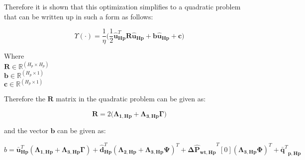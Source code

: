 Therefore it is shown that this optimization simplifies to a quadratic problem that can be written up in such a form as follows:

\begin{equation}
  \Upsilon(\cdot) = \frac{1}{\eta}\Big( \frac{1}{2} \bm{\hat{u}}_{\bm{Hp}}^{T} \bm{R} \bm{\hat{u}}_{\bm{Hp}} + \bm{b} \bm{\hat{u}}_{\bm{Hp}} + \bm{c} \Big)
\end{equation}

\begin{minipage}[t]{0.28\textwidth}
Where\\
\hspace*{8mm} $\bm{R} \in \pmb{\mathbb{R}}^{(H_p \times H_p)} $ \\
\hspace*{8mm} $\bm{b} \in \pmb{\mathbb{R}}^{(H_p \times 1)} $ \\
\hspace*{8mm} $\bm{c} \in \pmb{\mathbb{R}}^{(H_p \times 1)} $
\end{minipage}

Therefore the $\bm{R}$ matrix in the quadratic problem can be given as:

\begin{equation}
  \bm{R} = 2\Big(\bm{\Lambda}_{\bm{1,Hp}} + \bm{\Lambda}_{\bm{3,Hp}} \bm{\Gamma}\Big) 
\end{equation}

and the vector $\bm{b}$ can be given as:

\begin{equation}
  b = \bm{\bar{u}}_{\bm{Hp}}^{T}(\bm{\Lambda}_{\bm{1,Hp}} + \bm{\Lambda}_{\bm{3,Hp}} \bm{\Gamma} ) + \bm{\hat{d}}_{\bm{Hp}}^{T}(\bm{\Lambda}_{\bm{2,Hp}} + \bm{\Lambda}_{\bm{3,Hp}} \bm{\Psi} )^{T}
  + \bm{\Delta \hat{P}_{\bm{wt,Hp}}}^{T}[0] (\bm{\Lambda}_{\bm{3,Hp}} \bm{\Phi})^{T} + {\bm{\bar{q}}^{T}}_{\bm{p,Hp}}
\end{equation}